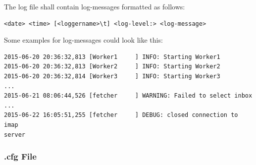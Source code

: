 The log file shall contain log-messages formatted as follows:

\begin{verbatim}
<date> <time> [<loggername>\t] <log-level:> <log-message>
\end{verbatim}

Some examples for log-messages could look like this:

\begin{verbatim}
2015-06-20 20:36:32,813 [Worker1     ] INFO: Starting Worker1
2015-06-20 20:36:32,813 [Worker2     ] INFO: Starting Worker2
2015-06-20 20:36:32,814 [Worker3     ] INFO: Starting Worker3
...
2015-06-21 08:06:44,526 [fetcher     ] WARNING: Failed to select inbox
...
2015-06-22 16:05:51,255 [fetcher     ] DEBUG: closed connection to imap
server
\end{verbatim}

\subsubsection{.cfg File}

